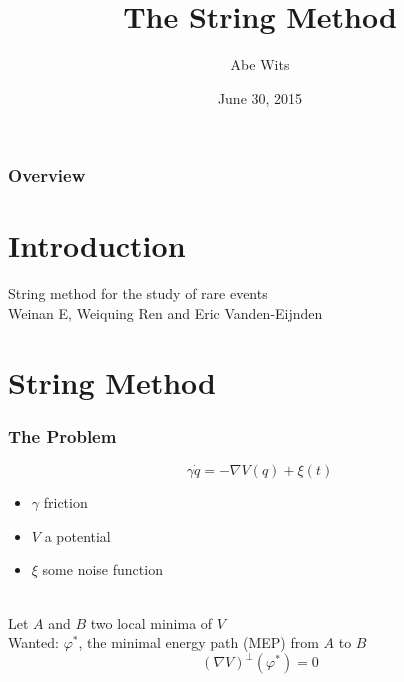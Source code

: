 \documentclass{beamer}
\title[String Method]{The String Method} %
\author{Abe Wits}
\institute[UU]
{
Utrecht University\\
\medskip
\textit{A.J.G.Wits@uu.nl}
}
\date{June 30, 2015}
\renewcommand{\phi}{\varphi}
\renewcommand{\(}{\left(}
\renewcommand{\)}{\right)}
\begin{document}
\begin{frame}
\titlepage
\end{frame}

\begin{frame}
\frametitle{Overview}
\tableofcontents
\end{frame}

\section{Introduction}%
\begin{frame}
String method for the study of rare events\\
Weinan E, Weiquing Ren and Eric Vanden-Eijnden
\end{frame}


\section{String Method}%
\begin{frame}
\frametitle{The Problem}
$$\gamma \dot{q} = -\nabla V(q)+\xi(t)$$
\begin{itemize}
\item $\gamma$ friction
\item $V$ a potential
\item $\xi$ some noise function
\end{itemize}
~\\
Let $A$ and $B$ two local minima of $V$\\
Wanted: $\phi^*$, the minimal energy path (MEP) from $A$ to $B$
$$(\nabla V)^\bot(\phi^*)=0$$
\end{frame}
\end{document}
